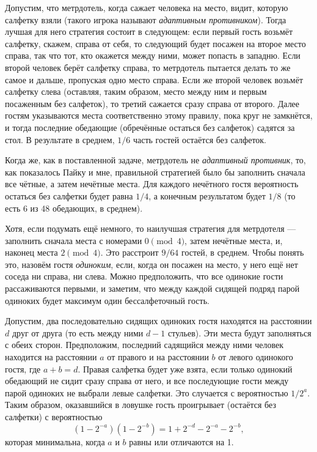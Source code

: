 Допустим, что метрдотель, когда сажает человека на место, видит, которую салфетку взяли (такого игрока называют \emph{адаптивным противником}). %
Тогда лучшая для него стратегия состоит в следующем:
если первый гость возьмёт салфетку, скажем, справа от себя, то следующий будет посажен на второе место справа, так что тот, кто окажется между ними, может попасть в западню.
Если второй человек берёт салфетку справа, то метрдотель пытается делать то же самое и дальше, пропуская одно место справа.
Если же второй человек возьмёт салфетку слева (оставляя, таким образом, место между ним и первым посаженным без салфеток), то третий сажается сразу справа от второго.
Далее гостям указываются места соответственно этому правилу, пока круг не замкнётся, и тогда последние обедающие (обречённые остаться без салфеток) садятся за стол.
В результате в среднем, $1/6$ часть гостей остаётся без салфеток.

Когда же, как в поставленной задаче, метрдотель не \emph{адаптивный противник}, то, как показалось Пайку и мне, правильной стратегией было бы заполнить сначала все чётные, а затем нечётные места.
Для каждого нечётного гостя вероятность остаться без салфетки будет равна $1/4$, %
а конечным результатом будет $1/8$ (то есть 6 из 48 обедающих, в среднем).

Хотя, если подумать ещё немного, то наилучшая стратегия для метрдотеля --- заполнить сначала места с номерами $0\pmod4$, затем нечётные места, и, наконец места $2\pmod4$.
Это расстроит $9/64$ гостей, в среднем.
Чтобы понять это, назовём гостя \emph{одиноким}, если, когда он посажен на место, у него ещё нет соседа ни справа, ни слева.
Можно предположить, что все одинокие гости рассаживаются первыми, и заметим, что между каждой сидящей подряд парой одиноких будет максимум один бессалфеточный гость.

Допустим, два последовательно сидящих одиноких гостя находятся на расстоянии $d$ друг от друга (то есть между ними $d-1$ стульев).
Эти места будут заполняться с обеих сторон.
Предположим, последний садящийся между ними человек находится на расстоянии $a$ от правого и на расстоянии $b$ от левого одинокого гостя, где $a+b=d$.
Правая салфетка будет уже взята, если только одинокий обедающий не сидит сразу справа от него, и все последующие гости между парой одиноких не выбрали левые салфетки.
Это случается с вероятностью $1/2^a$.
Таким образом, оказавшийся в ловушке 
гость проигрывает (остаётся без салфетки) с вероятностью
\[(1-2^{-a})(1-2^{-b})=1 + 2^{-d}-2^{-a}-2^{-b},\]
которая минимальна, когда $a$ и $b$ равны или отличаются на 1.

